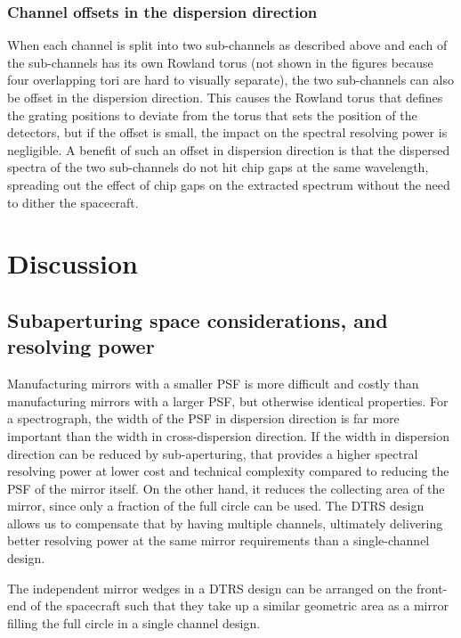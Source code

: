 \documentclass[linenumbers]{aastex631}
\begin{document}
\subsubsection{Channel offsets in the dispersion direction}
When each channel is split into two sub-channels as described above and each of the sub-channels has its own Rowland torus (not shown in the figures because four overlapping tori are hard to visually separate), the two sub-channels can also be offset in the dispersion direction. This causes the Rowland torus that defines the grating positions to deviate from the torus that sets the position of the detectors, but if the offset is small, the impact on the spectral resolving power is negligible. A benefit of such an offset in dispersion direction is that the dispersed spectra of the two sub-channels do not hit chip gaps at the same wavelength, spreading out the effect of chip gaps on the extracted spectrum without the need to dither the spacecraft.


\section{Discussion}
\label{sect:discussion}

\subsection{Subaperturing space considerations, and resolving power}
Manufacturing mirrors with a smaller PSF is more difficult and costly than manufacturing mirrors with a larger PSF, but otherwise identical properties. For a spectrograph, the width of the PSF in dispersion direction is far more important than the width in cross-dispersion direction. If the width in dispersion direction can be reduced by sub-aperturing, that provides a higher spectral resolving power at lower cost and technical complexity compared to reducing the PSF of the mirror itself. On the other hand, it reduces the collecting area of the mirror, since only a fraction of the full circle can be used. The DTRS design allows us to compensate that by having multiple channels, ultimately delivering better resolving power at the same mirror requirements than a single-channel design.

The independent mirror wedges in a DTRS design can be arranged on the front-end of the spacecraft such that they take up a similar geometric area as a mirror filling the full circle in a single channel design.
\end{document}
